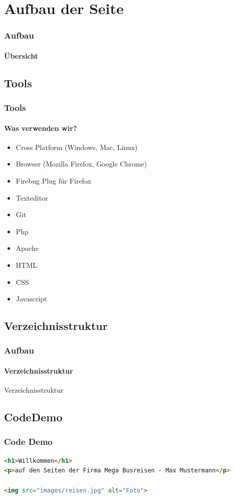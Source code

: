 \documentclass[xcolor=dvipsnames]{beamer}
\begin{document}
\section{Aufbau der Seite}
\begin{frame} %
  \frametitle{Aufbau} %
  \framesubtitle{Übersicht} %
	\tableofcontents[currentsection] 
\end{frame}

\subsection{Tools}
\begin{frame} %
  \frametitle{Tools} %
  \framesubtitle{Was verwenden wir?} %
  \begin{block}{}
	  \begin{itemize}
		\item Cross Platform (Windows, Mac, Linux)
		\item Browser (Mozilla Firefox, Google Chrome)  	
		\item Firebug Plug für Firefox
  		\item Texteditor
	  	\item Git
		\item Php
		\item Apache
		\item HTML
		\item CSS
		\item Javascript
	  \end{itemize}
  \end{block}
\end{frame}


\subsection{Verzeichnisstruktur}
\begin{frame} %
  \frametitle{Aufbau} %
  \framesubtitle{Verzeichnisstruktur} %
  \begin{block}{Verzeichnisstruktur}
  \end{block}
\end{frame}

\subsection{CodeDemo}
\begin{frame}[fragile]
\frametitle{Code Demo}

\begin{lstlisting}[language=HTML]
<h1>Willkommen</h1>
<p>auf den Seiten der Firma Mega Busreisen - Max Mustermann</p>

<img src="images/reisen.jpg" alt="Foto">

\end{lstlisting}
\end{frame}
\end{document}

